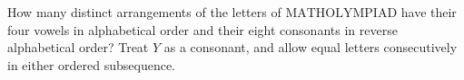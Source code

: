 How many distinct arrangements of the letters of $\text{MATHOLYMPIAD}$ have their four vowels in alphabetical order and their eight consonants in reverse alphabetical order? Treat $Y$ as a consonant, and allow equal letters consecutively in either ordered subsequence.
